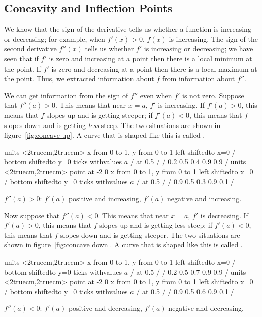 \subsection{Concavity and Inflection Points}\label{sec:Concavity}
We know that the sign of the derivative tells us whether a function is
increasing or decreasing; for example, when $f'(x)>0$,
$f(x)$ is increasing. The sign of the second derivative
$f''(x)$ tells us whether $f'$ is increasing or decreasing; we have
seen that if $f'$ is zero and increasing at a point then there is a
local minimum at the point. If $f'$ is zero and decreasing at a
point then there is a local maximum at the point. Thus, we extracted
information about $f$ from information about $f''$. 

We can get information from the sign of $f''$ even when $f'$ is not
zero. Suppose that $f''(a)>0$. This means that near $x=a$, $f'$ is
increasing. If $f'(a)>0$, this means that $f$ slopes up and is getting
steeper; if $f'(a)<0$, this means that $f$ slopes down and is getting
{\it less} steep. The two situations are shown in
figure~\ref{fig:concave up}. A curve that is shaped like this is
called .


\figure[H]
\centerline{\vbox{\beginpicture
\normalgraphs
\setcoordinatesystem units <2truecm,2truecm>
\setplotarea x from 0 to 1, y from 0 to 1
\axis left shiftedto x=0 /
\axis bottom shiftedto y=0 ticks withvalues {$a$} / at 0.5 / /
\setquadratic
{} 0.2 0.5 0.4 0.9 0.9 /
\setcoordinatesystem units <2truecm,2truecm> point at -2 0
\setplotarea x from 0 to 1, y from 0 to 1
\axis left shiftedto x=0 /
\axis bottom shiftedto y=0 ticks withvalues {$a$} / at 0.5 / /
\setquadratic
{} 0.9 0.5 0.3 0.9 0.1 /
\endpicture}}
\caption{$f''(a)>0$: $f'(a)$ positive and increasing, $f'(a)$ negative and
  increasing. \label{fig:concave up}}
\endfigure

Now suppose that $f''(a)<0$. This means that near $x=a$, $f'$ is
decreasing. If $f'(a)>0$, this means that $f$ slopes up and is getting
less steep; if $f'(a)<0$, this means that $f$ slopes down and is getting
steeper. The two situations are shown in
figure~\ref{fig:concave down}. A curve that is shaped like this is
called .


\figure[H]
\centerline{\vbox{\beginpicture
\normalgraphs
\setcoordinatesystem units <2truecm,2truecm>
\setplotarea x from 0 to 1, y from 0 to 1
\axis left shiftedto x=0 /
\axis bottom shiftedto y=0 ticks withvalues {$a$} / at 0.5 / /
\setquadratic
{} 0.2 0.5 0.7 0.9 0.9 /
\setcoordinatesystem units <2truecm,2truecm> point at -2 0
\setplotarea x from 0 to 1, y from 0 to 1
\axis left shiftedto x=0 /
\axis bottom shiftedto y=0 ticks withvalues {$a$} / at 0.5 / /
\setquadratic
{} 0.9 0.5 0.6 0.9 0.1 /
\endpicture}}
\caption{$f''(a)<0$: $f'(a)$ positive and decreasing, $f'(a)$ negative and
  decreasing. \label{fig:concave down}}
\endfigure

